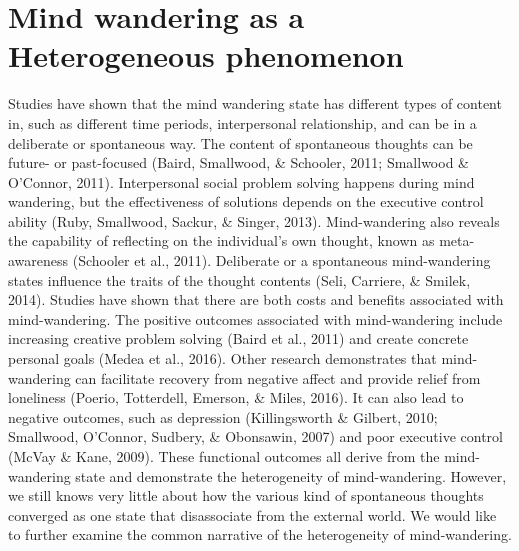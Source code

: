 \section{Mind wandering as a Heterogeneous phenomenon}
\label{intro:heterogeneous}
Studies have shown that the mind wandering state has different types of content in, such as different time periods, interpersonal relationship, and can be in a deliberate or spontaneous way. The content of spontaneous thoughts can be future- or past-focused (Baird, Smallwood, \& Schooler, 2011; Smallwood \& O’Connor, 2011). Interpersonal social problem solving happens during mind wandering, but the effectiveness of solutions depends on the executive control ability (Ruby, Smallwood, Sackur, \& Singer, 2013). Mind-wandering also reveals the capability of reflecting on the individual’s own thought, known as meta-awareness (Schooler et al., 2011). Deliberate or a spontaneous mind-wandering states influence the traits of the thought contents (Seli, Carriere, \& Smilek, 2014). Studies have shown that there are both costs and benefits associated with mind-wandering. The positive outcomes associated with mind-wandering include increasing creative problem solving (Baird et al., 2011) and create concrete personal goals (Medea et al., 2016). Other research demonstrates that mind-wandering can facilitate recovery from negative affect \cite{Ruby2013a} and provide relief from loneliness (Poerio, Totterdell, Emerson, \& Miles, 2016). It can also lead to negative outcomes, such as depression (Killingsworth \& Gilbert, 2010; Smallwood, O’Connor, Sudbery, \& Obonsawin, 2007) and poor executive control (McVay \& Kane, 2009). These functional outcomes all derive from the mind-wandering state and demonstrate the heterogeneity of mind-wandering. However, we still knows very little about how the various kind of spontaneous thoughts converged as one state that disassociate from the external world. We would like to further examine the common narrative of the heterogeneity of mind-wandering.  
